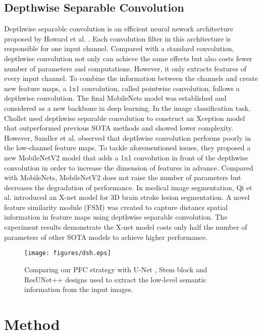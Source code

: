 \documentclass[a4paper,fleqn]{cas-dc}
\begin{document}
\subsection{Depthwise Separable Convolution}
Depthwise separable convolution is an efficient neural nework architecture proposed by Howard et al. \cite{howard2017mobilenets}. Each convolution filter in this architecture is responsible for one input channel. Compared with a standard convolution, depthwise convolution not only can achieve the same effects but also costs fewer number of parameters and computations. However, it only extracts features of every input channel. To combine the information between the channels and create new feature maps, a 1x1 convolution, called pointwise convolution, follows a depthwise convolution. The final MobileNets model was established and considered as a new backbone in deep learning. In the image classification task, Chollet \cite{chollet2017xception} used depthwise separable convolution to construct an Xception model that outperformed previous SOTA methods and showed lower complexity. However, Sandler et al. \cite{sandler2018mobilenetv2} observed that depthwise convolution performs poorly in the low-channel feature maps. To tackle aforementioned issues, they proposed a new MobileNetV2  model that adds a 1x1 convolution in front of the depthwise convolution in order to increase the dimension of features in advance. Compared with MobileNets, MobileNetV2 does not raise the number of parameters but decreases the degradation of performance. In medical image segmentation, Qi et al. \cite{qi2019x} introduced an X-net model for 3D brain stroke lesion segmentation. A novel feature similarity module (FSM) was created to capture distance spatial information in feature maps using depthwise separable convolution. The experiment results demonstrate the X-net model costs only half the number of parameters of other SOTA models to achieve higher performance.

\begin{figure*}
  \centering
  \texttt{[image: figures/dsh.eps]}
  \caption{Comparing our PFC strategy with U-Net \cite{ronneberger2015u}, Stem block \cite{chen2019mmdetection} and ResUNet++ \cite{jha2019resunet++} designs used to extract the low-level semantic information from the input images.}
  \label{fig:dsh}
\end{figure*}




\section{Method}
\label{sec:pagestyle}
\end{document}
